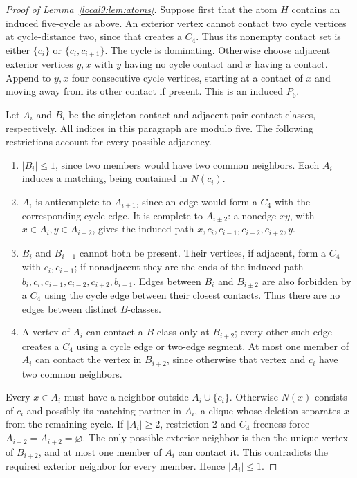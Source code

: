 \documentclass[11pt,a4paper]{article}
\theoremstyle{definition}\newtheorem{definition}[theorem]{Definition}
\theoremstyle{remark}\newtheorem{remark}[theorem]{Remark}
\begin{document}
\begin{proof}[Proof of Lemma~\ref{local9:lem:atoms}]
Suppose first that the atom $H$ contains an induced five-cycle as above.
An exterior vertex cannot contact two cycle vertices at cycle-distance
two, since that creates a $C_4$. Thus its nonempty contact set is either
$\{c_i\}$ or $\{c_i,c_{i+1}\}$. The cycle is dominating. Otherwise choose
adjacent exterior vertices $y,x$ with $y$ having no cycle contact and $x$
having a contact. Append to $y,x$ four consecutive cycle vertices, starting
at a contact of $x$ and moving away from its other contact if present.
This is an induced $P_6$.

Let $A_i$ and $B_i$ be the singleton-contact and adjacent-pair-contact
classes, respectively. All indices in this paragraph are modulo five.
The following restrictions account for every possible adjacency.
\begin{enumerate}
\item $|B_i|\le1$, since two members would have two common neighbors.
Each $A_i$ induces a matching, being contained in $N(c_i)$.
\item $A_i$ is anticomplete to $A_{i\pm1}$, since an edge would form a
$C_4$ with the corresponding cycle edge. It is complete to $A_{i\pm2}$:
a nonedge $xy$, with $x\in A_i,y\in A_{i+2}$, gives the induced path
$x,c_i,c_{i-1},c_{i-2},c_{i+2},y$.
\item $B_i$ and $B_{i+1}$ cannot both be present. Their vertices, if
adjacent, form a $C_4$ with $c_i,c_{i+1}$; if nonadjacent they are the ends
of the induced path
$b_i,c_i,c_{i-1},c_{i-2},c_{i+2},b_{i+1}$.
Edges between $B_i$ and $B_{i\pm2}$ are also forbidden by a $C_4$ using
the cycle edge between their closest contacts. Thus there are no edges
between distinct $B$-classes.
\item A vertex of $A_i$ can contact a $B$-class only at $B_{i+2}$; every
other such edge creates a $C_4$ using a cycle edge or two-edge segment.
At most one member of $A_i$ can contact the vertex in $B_{i+2}$, since
otherwise that vertex and $c_i$ have two common neighbors.
\end{enumerate}

Every $x\in A_i$ must have a neighbor outside $A_i\cup\{c_i\}$.
Otherwise $N(x)$ consists of $c_i$ and possibly its matching partner in
$A_i$, a clique whose deletion separates $x$ from the remaining cycle.
If $|A_i|\ge2$, restriction 2 and $C_4$-freeness force
$A_{i-2}=A_{i+2}=\varnothing$. The only possible exterior neighbor is
then the unique vertex of $B_{i+2}$, and at most one member of $A_i$ can
contact it. This contradicts the required exterior neighbor for every
member. Hence $|A_i|\le1$.


\end{proof}
\end{document}
